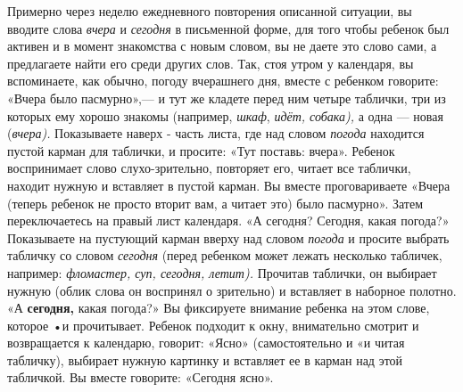 \documentclass[a5paper]{book}
\renewcommand{\emph}[1]{\textit{#1}}
\begin{document}
Примерно через неделю ежедневного повторения описанной ситуации, вы
вводите слова \emph{вчера} и \emph{сегодня} в письменной форме, для того
чтобы ребенок был активен и в момент знакомства с новым словом, вы не
даете это слово сами, а предлагаете найти его среди других слов. Так,
стоя утром у календаря, вы вспоминаете, как обычно, погоду вчерашнего
дня, вместе с ребенком говорите: «Вчера было пасмурно»,--- и тут же
кладете перед ним четыре таблички, три из которых ему хорошо знакомы
(например, \emph{шкаф}, \emph{идёт, собака),} а одна --- новая
(\emph{вчера).} Показываете наверх - часть листа, где над словом
\emph{погода} находится пустой карман для таблички, и просите: «Тут
поставь: вчера». Ребенок воспринимает слово слухо-зрительно, повторяет
его, читает все таблички, находит нужную и вставляет в пустой карман. Вы
вместе проговариваете «Вчера (теперь ребенок не просто вторит вам, а
читает это) было пасмурно». Затем переключаетесь на правый лист
календаря. «А сегодня? Сегодня, какая погода?» Показываете на пустующий
карман вверху над словом \emph{погода} и просите выбрать табличку со
словом \emph{сегодня} (перед ребенком может лежать несколько табличек,
например: \emph{фломастер, суп, сегодня, летит).} Прочитав таблички, он
выбирает нужную (облик слова он воспринял о зрительно) и вставляет в
наборное полотно. «А \textbf{сегодня,} какая погода?» Вы фиксируете
внимание ребенка на этом слове, которое •и прочитывает. Ребенок подходит
к окну, внимательно смотрит и возвращается к календарю, говорит: «Ясно»
(самостоятельно и «и читая табличку), выбирает нужную картинку и
вставляет ее в карман над этой табличкой. Вы вместе говорите: «Сегодня
ясно».
\end{document}
